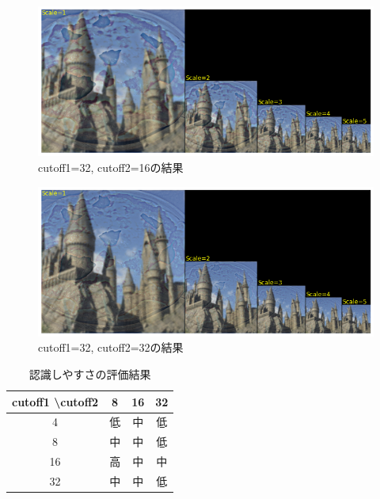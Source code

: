 \documentclass[12pt]{jarticle}
\begin{document}
\clearpage
\begin{figure}[h]
    \begin{center}
        \includegraphics[scale=0.7]{kadai4_3_15.png}
    \end{center}
    \caption{cutoff1=32, cutoff2=16の結果}
\end{figure}

\begin{figure}[h]
    \begin{center}
        \includegraphics[scale=0.7]{kadai4_3_16.png}
    \end{center}
    \caption{cutoff1=32, cutoff2=32の結果}
\end{figure}

\clearpage
\begin{table}[htb]
    \caption{認識しやすさの評価結果}
    \begin{center}
        \begin{tabular}{|c||c|c|c|}
            \hline
            cutoff1 \textbackslash cutoff2 & 8  & 16 & 32 \\ \hline \hline
            4                              & 低 & 中 & 低 \\ \hline
            8                              & 中 & 中 & 低 \\ \hline
            16                             & 高 & 中 & 中 \\ \hline
            32                             & 中 & 中 & 低 \\ \hline
        \end{tabular}
    \end{center}
\end{table}
\end{document}
